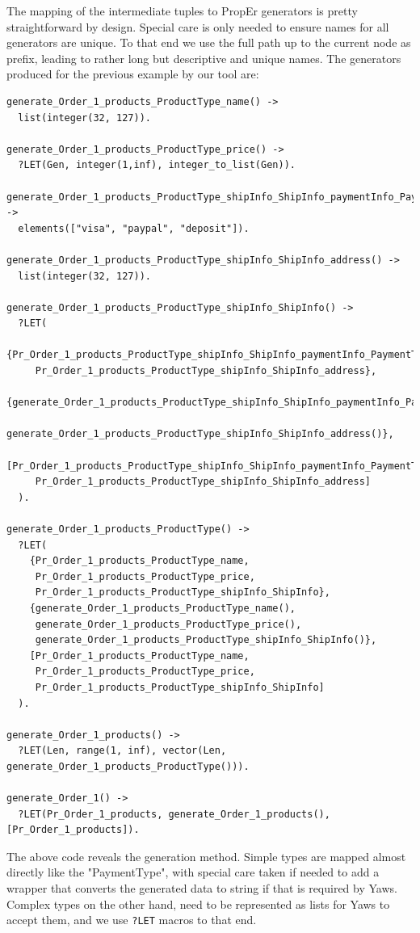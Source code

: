 \documentclass[submission,copyright,a4]{eptcs}
\newcommand{\LET}{\texttt{?LET}\xspace}
\begin{document}
The mapping of the intermediate tuples to PropEr generators is pretty straightforward by design. 
Special care is only needed to ensure names for all generators are unique. To that end we use 
the full path up to the current node as prefix, leading to rather long but descriptive and unique 
names. The generators produced for the previous example by our tool are:

\begin{lstlisting}
generate_Order_1_products_ProductType_name() -> 
  list(integer(32, 127)).

generate_Order_1_products_ProductType_price() ->  
  ?LET(Gen, integer(1,inf), integer_to_list(Gen)).

generate_Order_1_products_ProductType_shipInfo_ShipInfo_paymentInfo_PaymentType() -> 
  elements(["visa", "paypal", "deposit"]).

generate_Order_1_products_ProductType_shipInfo_ShipInfo_address() -> 
  list(integer(32, 127)).

generate_Order_1_products_ProductType_shipInfo_ShipInfo() -> 
  ?LET(
    {Pr_Order_1_products_ProductType_shipInfo_ShipInfo_paymentInfo_PaymentType,
     Pr_Order_1_products_ProductType_shipInfo_ShipInfo_address},
    {generate_Order_1_products_ProductType_shipInfo_ShipInfo_paymentInfo_PaymentType(),
     generate_Order_1_products_ProductType_shipInfo_ShipInfo_address()},
    [Pr_Order_1_products_ProductType_shipInfo_ShipInfo_paymentInfo_PaymentType,
     Pr_Order_1_products_ProductType_shipInfo_ShipInfo_address]
  ).

generate_Order_1_products_ProductType() -> 
  ?LET(
    {Pr_Order_1_products_ProductType_name, 
     Pr_Order_1_products_ProductType_price, 
     Pr_Order_1_products_ProductType_shipInfo_ShipInfo},
    {generate_Order_1_products_ProductType_name(), 
     generate_Order_1_products_ProductType_price(), 
     generate_Order_1_products_ProductType_shipInfo_ShipInfo()},
    [Pr_Order_1_products_ProductType_name, 
     Pr_Order_1_products_ProductType_price, 
     Pr_Order_1_products_ProductType_shipInfo_ShipInfo] 
  ).

generate_Order_1_products() -> 
  ?LET(Len, range(1, inf), vector(Len, generate_Order_1_products_ProductType())).

generate_Order_1() -> 
  ?LET(Pr_Order_1_products, generate_Order_1_products(), [Pr_Order_1_products]).
\end{lstlisting}

The above code reveals the generation method. Simple types are mapped almost directly 
like the "PaymentType", with special care taken if needed to add a wrapper that converts 
the generated data to string if that is required by Yaws. Complex types on the other hand, 
need to be represented as lists for Yaws to accept them, and we use \LET macros to that end. 
\end{document}
